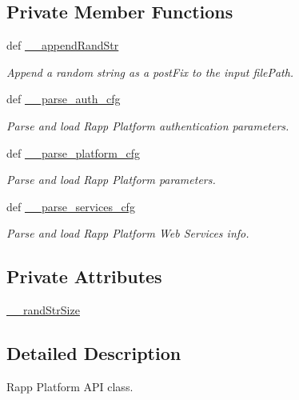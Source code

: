 \subsection*{Private Member Functions}
\begin{DoxyCompactItemize}
\item 
def \hyperlink{classRappCloud_1_1RappCloud_1_1RappCloud_a4b2f0fedd03068cc9fff44616d28670f}{\-\_\-\-\_\-append\-Rand\-Str}
\begin{DoxyCompactList}\small\item\em Append a random string as a post\-Fix to the input file\-Path. \end{DoxyCompactList}\item 
def \hyperlink{classRappCloud_1_1RappCloud_1_1RappCloud_aa7f38a539016bb8db70495c32b5fa888}{\-\_\-\-\_\-parse\-\_\-auth\-\_\-cfg}
\begin{DoxyCompactList}\small\item\em Parse and load Rapp Platform authentication parameters. \end{DoxyCompactList}\item 
def \hyperlink{classRappCloud_1_1RappCloud_1_1RappCloud_a39647e3e1f12ef6e3509b4b7975de8a0}{\-\_\-\-\_\-parse\-\_\-platform\-\_\-cfg}
\begin{DoxyCompactList}\small\item\em Parse and load Rapp Platform parameters. \end{DoxyCompactList}\item 
def \hyperlink{classRappCloud_1_1RappCloud_1_1RappCloud_a531043e4e783fd1a09efdd6c8529de89}{\-\_\-\-\_\-parse\-\_\-services\-\_\-cfg}
\begin{DoxyCompactList}\small\item\em Parse and load Rapp Platform Web Services info. \end{DoxyCompactList}\end{DoxyCompactItemize}
\subsection*{Private Attributes}
\begin{DoxyCompactItemize}
\item 
\hyperlink{classRappCloud_1_1RappCloud_1_1RappCloud_a65a3a87c5465d4f5c428dc0fc85c2078}{\-\_\-\-\_\-rand\-Str\-Size}
\end{DoxyCompactItemize}


\subsection{Detailed Description}
Rapp Platform A\-P\-I class. 

